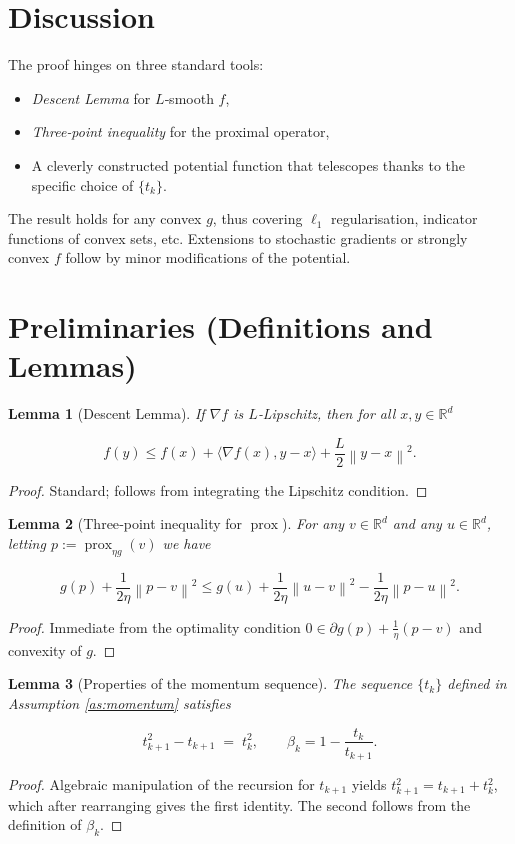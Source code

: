 \documentclass{article}
\newtheorem{lemma}{Lemma}
\newcommand{\prox}{\operatorname{prox}}
\newcommand{\R}{\mathbb{R}}
\newcommand{\norm}[1]{\left\lVert#1\right\rVert}
\begin{document}
\section*{Discussion}
The proof hinges on three standard tools:

\begin{itemize}
\item \emph{Descent Lemma} for $L$‑smooth $f$,
\item \emph{Three‑point inequality} for the proximal operator,
\item A cleverly constructed potential function that telescopes thanks to the
specific choice of $\{t_k\}$.
\end{itemize}

The result holds for any convex $g$, thus covering $\ell_{1}$ regularisation,
indicator functions of convex sets, etc. Extensions to stochastic gradients or
strongly convex $f$ follow by minor modifications of the potential.

\newpage
\section*{Preliminaries (Definitions and Lemmas)}
\begin{lemma}[Descent Lemma]\label{lem:descent}
If $\nabla f$ is $L$‑Lipschitz, then for all $x,y\in\R^{d}$  

\[
f(y)\le f(x)+\langle\nabla f(x),y-x\rangle+\frac{L}{2}\norm{y-x}^{2}.
\tag{L1}
\]
\end{lemma}
\begin{proof}
Standard; follows from integrating the Lipschitz condition.
\end{proof}

\begin{lemma}[Three‑point inequality for $\prox$]\label{lem:prox}
For any $v\in\R^{d}$ and any $u\in\R^{d}$, letting $p:=\prox_{\eta g}(v)$ we have  

\[
g(p)+\frac{1}{2\eta}\norm{p-v}^{2}\le g(u)+\frac{1}{2\eta}\norm{u-v}^{2}
-\frac{1}{2\eta}\norm{p-u}^{2}.
\tag{L2}
\]
\end{lemma}
\begin{proof}
Immediate from the optimality condition
$0\in \partial g(p)+\frac{1}{\eta}(p-v)$ and convexity of $g$.
\end{proof}

\begin{lemma}[Properties of the momentum sequence]\label{lem:beta}
The sequence $\{t_k\}$ defined in Assumption \ref{as:momentum} satisfies  

\[
t_{k+1}^{2}-t_{k+1}\;=\;t_{k}^{2},\qquad 
\beta_{k}=1-\frac{t_{k}}{t_{k+1}}.
\tag{L3}
\]
\end{lemma}
\begin{proof}
Algebraic manipulation of the recursion for $t_{k+1}$ yields $t_{k+1}^{2}=t_{k+1}+t_{k}^{2}$,
which after rearranging gives the first identity. The second follows from the
definition of $\beta_k$.
\end{proof}
\end{document}
